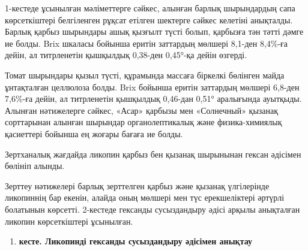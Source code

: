 1-кестеде ұсынылған мәліметтерге сәйкес, алынған барлық шырындардың сапа
көрсеткіштері белгіленген рұқсат етілген шектерге сәйкес келетіні
анықталды. Барлық қарбыз шырындары ашық қызғылт түсті болып, қарбызға
тән тәтті дәмге ие болды. Brix шкаласы бойынша еритін заттардың мөлшері
8,1-ден 8,4\%-ға дейін, ал титрленетін қышқылдық 0,38-ден 0,45°-қа дейін
өзгерді.

Томат шырындары қызыл түсті, құрамында массаға біркелкі бөлінген майда
ұнтақталған целлюлоза болды. Brix бойынша еритін заттардың мөлшері
6,8-ден 7,6\%-ға дейін, ал титрленетін қышқылдық 0,46-дан 0,51°
аралығында ауытқыды. Алынған нәтижелерге сәйкес, «Асар» қарбызы мен
«Солнечный» қызанақ сорттарынан алынған шырындар органолептикалық және
физика-химиялық қасиеттері бойынша ең жоғары бағаға ие болды.

Зертханалық жағдайда ликопин қарбыз бен қызанақ шырынынан гексан
әдісімен бөлініп алынды.

Зерттеу нәтижелері барлық зерттелген қарбыз және қызанақ үлгілерінде
ликопиннің бар екенін, алайда оның мөлшері мен түс ерекшеліктері әртүрлі
болатынын көрсетті. 2-кестеде гександы сусыздандыру әдісі арқылы
анықталған ликопин көрсеткіштері ұсынылған.

\begin{enumerate}
\def\labelenumi{\arabic{enumi}.}
\setcounter{enumi}{1}
\item
  {\bfseries кесте. Ликопинді гександы сусыздандыру әдісімен анықтау}
\end{enumerate}


